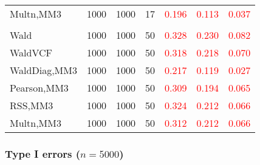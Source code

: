 \documentclass[
]{article}
\begin{document}
\begin{table}[H]
{\begin{tabular}[t]{lrrrrrr}
\hspace{1em}Multn,MM3 & 1000 & 1000 & 17 & \textcolor{red}{0.196} & \textcolor{red}{0.113} & \textcolor{red}{0.037}\\
\addlinespace[0.3em]
\multicolumn{7}{l}{\textbf{3F 15V}}\\
\hspace{1em}Wald & 1000 & 1000 & 50 & \textcolor{red}{0.328} & \textcolor{red}{0.230} & \textcolor{red}{0.082}\\
\hspace{1em}WaldVCF & 1000 & 1000 & 50 & \textcolor{red}{0.318} & \textcolor{red}{0.218} & \textcolor{red}{0.070}\\
\hspace{1em}WaldDiag,MM3 & 1000 & 1000 & 50 & \textcolor{red}{0.217} & \textcolor{red}{0.119} & \textcolor{red}{0.027}\\
\hspace{1em}Pearson,MM3 & 1000 & 1000 & 50 & \textcolor{red}{0.309} & \textcolor{red}{0.194} & \textcolor{red}{0.065}\\
\hspace{1em}RSS,MM3 & 1000 & 1000 & 50 & \textcolor{red}{0.324} & \textcolor{red}{0.212} & \textcolor{red}{0.066}\\
\hspace{1em}Multn,MM3 & 1000 & 1000 & 50 & \textcolor{red}{0.312} & \textcolor{red}{0.212} & \textcolor{red}{0.066}\\
\bottomrule
\end{tabular}}
\endgroup{}
\end{table}

\hypertarget{type-i-errors-n5000-1}{%
\subsubsection{\texorpdfstring{Type I errors
(\(n=5000\))}{Type I errors (n=5000)}}\label{type-i-errors-n5000-1}}
\end{document}
